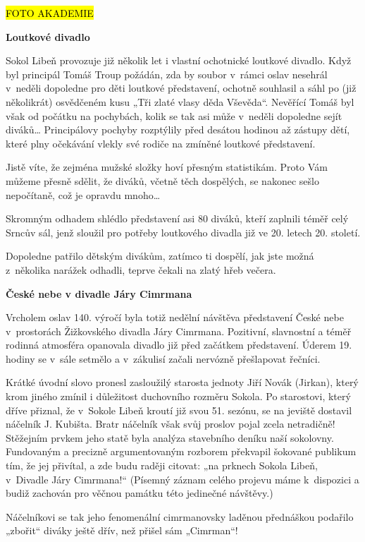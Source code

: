 \hl{FOTO AKADEMIE}

\textbf{Loutkové divadlo}

Sokol Libeň provozuje již několik let i vlastní ochotnické loutkové
divadlo. Když byl principál Tomáš Troup požádán, zda by soubor v~rámci
oslav nesehrál v~neděli dopoledne pro děti loutkové představení, ochotně
souhlasil a sáhl po (již několikrát) osvědčeném kusu „Tři zlaté vlasy
děda Vševěda``. Nevěřící Tomáš byl však od počátku na pochybách, kolik
se tak asi může v~neděli dopoledne sejít diváků\ldots{} Principálovy
pochyby rozptýlily před desátou hodinou až zástupy dětí, které plny
očekávání vlekly své rodiče na zmíněné loutkové představení.

Jistě víte, že zejména mužské složky hoví přesným statistikám. Proto Vám
můžeme přesně sdělit, že diváků, včetně těch dospělých, se nakonec sešlo
nepočítaně, což je opravdu mnoho\ldots{}

Skromným odhadem shlédlo představení asi 80 diváků, kteří zaplnili téměř
celý Srncův sál, jenž sloužil pro potřeby loutkového divadla již ve 20.
letech 20. století.

Dopoledne patřilo dětským divákům, zatímco ti dospělí, jak jste možná
z~několika narážek odhadli, teprve čekali na zlatý hřeb večera.

\textbf{České nebe v divadle Járy Cimrmana}

Vrcholem oslav 140. výročí byla totiž nedělní návštěva představení České
nebe v~prostorách Žižkovského divadla Járy Cimrmana. Pozitivní,
slavnostní a téměř rodinná atmosféra opanovala divadlo již před začátkem
představení. Úderem 19. hodiny se v~sále setmělo a v~zákulisí začali
nervózně přešlapovat řečníci.

Krátké úvodní slovo pronesl zasloužilý starosta jednoty Jiří Novák
(Jirkan), který krom jiného zmínil i důležitost duchovního rozměru
Sokola. Po starostovi, který dříve přiznal, že v~Sokole Libeň kroutí již
svou 51. sezónu, se na jeviště dostavil náčelník J. Kubišta. Bratr
náčelník však svůj proslov pojal zcela netradičně! Stěžejním prvkem jeho
statě byla analýza stavebního deníku naší sokolovny. Fundovaným a
precizně argumentovaným rozborem překvapil šokované publikum tím, že jej
přivítal, a zde budu raději citovat: „na prknech Sokola Libeň, v~Divadle
Járy Cimrmana!{}`` (Písemný záznam celého projevu máme k~dispozici a
budiž zachován pro věčnou památku této jedinečné návštěvy.)

Náčelníkovi se tak jeho fenomenální cimrmanovsky laděnou přednáškou
podařilo „zbořit`` diváky ještě dřív, než přišel sám „Cimrman``!

